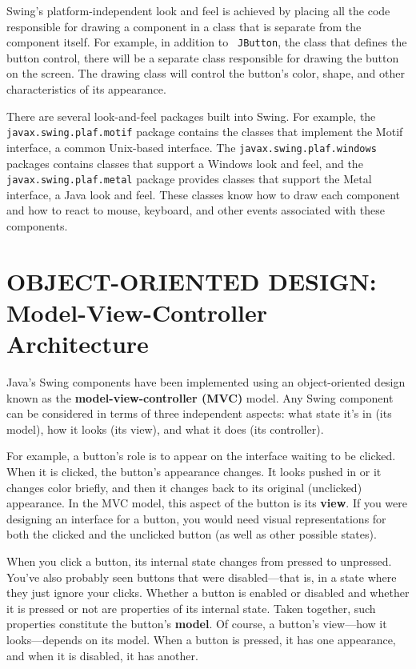 Swing's platform-independent look and feel is achieved by placing all
the code responsible for drawing a component in a class that is
separate from the component itself.  For example, in addition to {\tt
JButton}, the class that defines the button control, there will be a
separate class responsible for drawing the button on the screen.  The
drawing class will control the button's color, shape, and other
characteristics of its appearance.

There are several look-and-feel packages built into Swing.  For
example, the {\tt javax.swing.plaf.motif} package contains the classes
that implement the Motif interface, a common Unix-based interface.
The {\tt javax.swing.plaf.windows} packages contains classes that
support a Windows look and feel, and the {\tt javax.swing.plaf.metal}
package provides classes that support the Metal interface, a Java look
and feel. These classes know how to draw each component and how to
react to mouse, keyboard, and other events associated with these
components.  


\section{OBJECT-ORIENTED DESIGN:  \\Model-View-Controller Architecture}

\noindent Java's Swing components have been implemented using an
object-oriented design known as the {\bf model-view-controller (MVC)}
model.  Any Swing component can be considered in terms of three
independent aspects: what state it's in (its model), how it looks (its
view), and what it does (its controller).

For example, a button's role is to appear on the interface waiting to
be clicked.   When it is clicked, the button's appearance changes.  It
looks pushed in or it changes color briefly, and then it changes back
to its original (unclicked) appearance.   In the MVC model, this aspect
of the button is its {\bf view}. If you were designing an interface
for a button, you would need visual representations for both the
clicked and the unclicked button (as well as other possible states).

When you click a button, its internal state changes from pressed to
unpressed.  You've also probably seen buttons that were
disabled---that is, in a state where they just ignore your clicks.
Whether a button is enabled or disabled and whether it is pressed or
not are properties of its internal state.  Taken together, such properties
constitute the button's {\bf model}.  Of
course, a button's view---how it looks---depends on its model.  When a
button is pressed, it has one appearance, and when it is disabled, it
has another.

